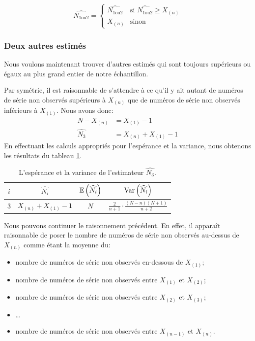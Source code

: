 \documentclass[10pt]{article}
\begin{document}
\[ \widehat{N_{1 \text{ou} 2}} = \begin{cases}
\widehat{N_{1 \text{ou} 2}} & \text{si } \widehat{N_{1 \text{ou} 2}} \geq X_{(n)} \\
X_{(n)} & \text{sinon}
\end{cases} \]

\hypertarget{deux-autres-estimes}{%
\subsubsection{Deux autres estimés}\label{deux-autres-estimes}}

Nous voulons maintenant trouver d'autres estimés qui sont toujours
supérieurs ou égaux au plus grand entier de notre échantillon.

Par symétrie, il est raisonnable de s'attendre à ce qu'il y ait autant
de numéros de série non observés supérieurs à \(X_{(n)}\) que de numéros
de série non observés inférieurs à \(X_{(1)}\). Nous avons donc:
\begin{align*}
N-X_{(n)} &= X_{(1)}-1 \\
\widehat{N_3} &= X_{(n)}+X_{(1)}-1
\end{align*} En effectuant les calculs appropriés pour l'espérance et la
variance, nous obtenons les résultats du tableau
\ref{tab:estimateur_n3}.

\begin{table}[ht]
\begin{center}
\begin{tabular}{cccc}
\toprule
$i$ & $\widehat{N_i}$ & $\operatorname{\mathbb{E}}\left(\widehat{N_i}\right)$ & $\operatorname{Var}\left(\widehat{N_i}\right)$ \\
\midrule
3 & $X_{(n)}+X_{(1)}-1$ & $N$ & $\frac{2}{n+1}\cdot\frac{(N-n)(N+1)}{n+2}$ \\
\bottomrule
\end{tabular}
\end{center}
\caption{\label{tab:estimateur_n3} {L'espérance et la variance de l'estimateur $\widehat{N_3}$.} }
\end{table}

Nous pouvons continuer le raisonnement précédent. En effet, il apparaît
raisonnable de poser le nombre de numéros de série non observés
au-dessus de \(X_{(n)}\) comme étant la moyenne du:

\begin{itemize}
\item
  nombre de numéros de série non observés en-dessous de \(X_{(1)}\);
\item
  nombre de numéros de série non observés entre \(X_{(1)}\) et
  \(X_{(2)}\);
\item
  nombre de numéros de série non observés entre \(X_{(2)}\) et
  \(X_{(3)}\);
\item
  \ldots{}
\item
  nombre de numéros de série non observés entre \(X_{(n-1)}\) et
  \(X_{(n)}\).
\end{itemize}
\end{document}
